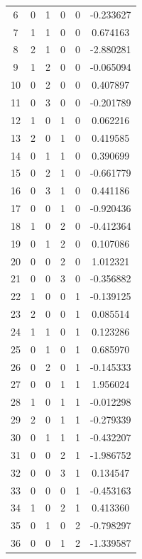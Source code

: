 \documentclass[preprint,12pt]{elsarticle}
\begin{document}
\begin{table}
\begin{minipage}[!h]{0.25\textwidth}
{\begin{tabular}{|c|cccc|c|}
6  &   0 &   1 &   0 &   0 &   -0.233627 \\
7  &   1 &   1 &   0 &   0 &    0.674163 \\
8  &   2 &   1 &   0 &   0 &   -2.880281 \\
9  &   1 &   2 &   0 &   0 &   -0.065094 \\
10 &   0 &   2 &   0 &   0 &    0.407897 \\
11 &   0 &   3 &   0 &   0 &   -0.201789 \\
12 &   1 &   0 &   1 &   0 &    0.062216 \\
13 &   2 &   0 &   1 &   0 &    0.419585 \\
14 &   0 &   1 &   1 &   0 &    0.390699 \\
15 &   0 &   2 &   1 &   0 &   -0.661779 \\
16 &   0 &   3 &   1 &   0 &    0.441186 \\
17 &   0 &   0 &   1 &   0 &   -0.920436 \\
18 &   1 &   0 &   2 &   0 &   -0.412364 \\
19 &   0 &   1 &   2 &   0 &    0.107086 \\
20 &   0 &   0 &   2 &   0 &    1.012321 \\
21 &   0 &   0 &   3 &   0 &   -0.356882 \\
22 &   1 &   0 &   0 &   1 &   -0.139125 \\
23 &   2 &   0 &   0 &   1 &    0.085514 \\
24 &   1 &   1 &   0 &   1 &    0.123286 \\
25 &   0 &   1 &   0 &   1 &    0.685970 \\
26 &   0 &   2 &   0 &   1 &   -0.145333 \\
27 &   0 &   0 &   1 &   1 &    1.956024 \\
28 &   1 &   0 &   1 &   1 &   -0.012298 \\
29 &   2 &   0 &   1 &   1 &   -0.279339 \\
30 &   0 &   1 &   1 &   1 &   -0.432207 \\
31 &   0 &   0 &   2 &   1 &   -1.986752 \\
32 &   0 &   0 &   3 &   1 &    0.134547 \\
33 &   0 &   0 &   0 &   1 &   -0.453163 \\
34 &   1 &   0 &   2 &   1 &    0.413360 \\
35 &   0 &   1 &   0 &   2 &   -0.798297 \\
36 &   0 &   0 &   1 &   2 &   -1.339587 \\

\end{tabular}}
\end{minipage}
\end{table}
\end{document}
